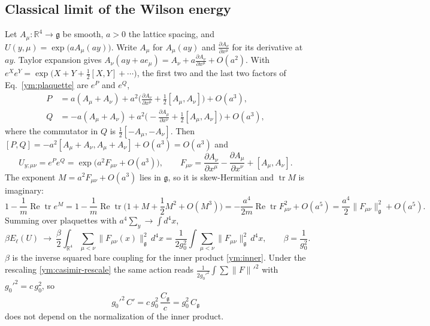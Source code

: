 \subsection{Classical limit of the Wilson energy}
Let $A_\mu\colon\mathbb R^4\to\mathfrak g$ be smooth, $a>0$ the lattice
spacing, and $U(y,\mu)=\exp\big(aA_\mu(ay)\big)$. Write $A_\mu$ for
$A_\mu(ay)$ and $\frac{\partial A_\nu}{\partial x^\mu}$ for its derivative at
$ay$. Taylor expansion gives $A_\nu(ay+ae_\mu)=A_\nu
+a\frac{\partial A_\nu}{\partial x^\mu}+O(a^2)$. With
$e^Xe^Y=\exp\big(X+Y+\frac12[X,Y]+\cdots\big)$, the first two and the last two
factors of Eq.~\eqref{ym:plaquette} are $e^P$ and $e^Q$,
\begin{align}
 P&=a(A_\mu+A_\nu)+a^2\Big(\frac{\partial A_\nu}{\partial x^\mu}
   +\frac12[A_\mu,A_\nu]\Big)+O(a^3),\\
 Q&=-a(A_\mu+A_\nu)+a^2\Big(-\frac{\partial A_\mu}{\partial x^\nu}
   +\frac12[A_\mu,A_\nu]\Big)+O(a^3),
\end{align}
where the commutator in $Q$ is $\frac12[-A_\mu,-A_\nu]$. Then
$[P,Q]=-a^2[A_\mu+A_\nu,A_\mu+A_\nu]+O(a^3)=O(a^3)$ and
\begin{equation}\label{ym:plaquette-expansion}
 U_{y;\mu\nu}=e^Pe^Q=\exp\big(a^2F_{\mu\nu}+O(a^3)\big),\qquad
 F_{\mu\nu}=\frac{\partial A_\nu}{\partial x^\mu}
 -\frac{\partial A_\mu}{\partial x^\nu}+[A_\mu,A_\nu].
\end{equation}
The exponent $M=a^2F_{\mu\nu}+O(a^3)$ lies in $\mathfrak g$, so it is
skew-Hermitian and $\operatorname{tr}M$ is imaginary:
\begin{equation}\label{ym:plaquette-energy}
 1-\frac1m\operatorname{Re}\operatorname{tr}e^M
 =1-\frac1m\operatorname{Re}\operatorname{tr}\Big(1+M+\frac12M^2+O(M^3)\Big)
 =-\frac{a^4}{2m}\operatorname{Re}\operatorname{tr}F_{\mu\nu}^2+O(a^5)
 =\frac{a^4}{2}\|F_{\mu\nu}\|_{\mathfrak g}^2+O(a^5).
\end{equation}
Summing over plaquettes with $a^4\sum_y\to\int d^4x$,
\begin{equation}\label{ym:classical-action}
 \beta E_\ell(U)\ \longrightarrow\ \frac{\beta}{2}\int_{\mathbb R^4}
 \sum_{\mu<\nu}\|F_{\mu\nu}(x)\|_{\mathfrak g}^2\,d^4x
 =\frac{1}{2g_0^2}\int\sum_{\mu<\nu}\|F_{\mu\nu}\|_{\mathfrak g}^2\,d^4x,
 \qquad\beta=\frac{1}{g_0^2}.
\end{equation}
$\beta$ is the inverse squared bare coupling for the inner product
\eqref{ym:inner}. Under the rescaling \eqref{ym:casimir-rescale} the same
action reads $\frac{1}{2g_0'^2}\int\sum\|F\|'^2$ with $g_0'^2=c\,g_0^2$, so
\begin{equation}\label{ym:invariant-combination}
 g_0'^2\,C'=c\,g_0^2\,\frac{C_{\mathfrak g}}{c}=g_0^2\,C_{\mathfrak g}
\end{equation}
does not depend on the normalization of the inner product.

